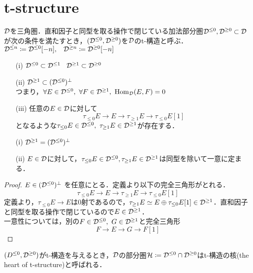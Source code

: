 \section{t-structure}
\begin{defn}\cite{BBD}
		${\mathcal D}$を三角圏．直和因子と同型を取る操作で閉じている加法部分圏${\mathcal D}^{\le 0},{\mathcal D}^{\ge 0}\subset{\mathcal D}$が次の条件を満たすとき，$({\mathcal D}^{\le 0},{\mathcal D}^{\ge 0})$を${\mathcal D}$のt-構造と呼ぶ．
		${\mathcal D}^{\le n}\coloneq{\mathcal D}^{\le 0}[-n],\hspace{3mm}{\mathcal D}^{\ge n}\coloneq{\mathcal D}^{\ge 0}[-n] $
		\begin{itemize}
			\item[(i)]
				${\mathcal D}^{\le 0}\subset{\mathcal D}^{\le 1}\hspace{3mm}{\mathcal D}^{\ge 1}\subset{\mathcal D}^{\ge 0} $
			\item[(ii)]
				${\mathcal D}^{\ge 1}\subset ({\mathcal D}^{\le 0})^\perp$\\
				つまり，$\forall E\in {\mathcal D}^{\le 0},\ \forall F\in{\mathcal D}^{\ge 1},\ \operatorname{\mathrm{Hom}}_{{\mathcal D}}(E,F)=0$
			\item[(iii)]
				任意の$E\in{\mathcal D}$に対して
				\[\tau_{\le 0}E\rightarrow E \rightarrow \tau_{\ge 1}E\rightarrow \tau_{\le 0}E[1]\]
				となるような$\tau_{\le 0}E\in\D^{\le 0},\ \tau_{\ge 1}E\in\D^{\ge 1}$が存在する．
		\end{itemize}
\end{defn}

\begin{lemm}
		\begin{itemize}
				\item[(i)]${\mathcal D}^{\ge 1}=({\mathcal D}^{\le 0})^{\perp}$
				\item[(ii)]$E\in{\mathcal D}$に対して，$\tau_{\le 0}E\in{\mathcal D}^{\le 0}, \tau_{\ge 1}E\in{\mathcal D}^{\ge 1}$は同型を除いて一意に定まる．
		\end{itemize}
\end{lemm}
	\begin{proof}
		$E\in\mathcal ({\mathcal D}^{\le 0})^\perp$ を任意にとる．定義より以下の完全三角形がとれる．
				\[\tau_{\le 0}E\rightarrow E \rightarrow \tau_{\ge 1}E\rightarrow \tau_{\le 0}E[1]\]
				定義より，$\tau_{\le 0}E\rightarrow E$は0射であるので，$\tau_{\ge 1}E\simeq E\oplus\tau_{\le 0}E[1]\in {\mathcal D}^{\ge 1}$．直和因子と同型を取る操作で閉じているので$E\in{\mathcal D}^{\ge 1}$．\\
				一意性については，別の$F\in\D^{\le 0},\ G\in\D^{\ge 1}$と完全三角形
				\[F\rightarrow E \rightarrow G\rightarrow F[1]\]
\end{proof}
\begin{defn}\cite{BBD}
	$(D^{\le 0},{\mathcal D}^{\ge 0})$がt-構造を与えるとき，${\mathcal D}$の部分圏${\mathcal H}\coloneq{\mathcal D}^{\le 0}\cap{\mathcal D}^{\ge 0}$はt-構造の核(the heart of t-structure)と呼ばれる．
\end{defn}

